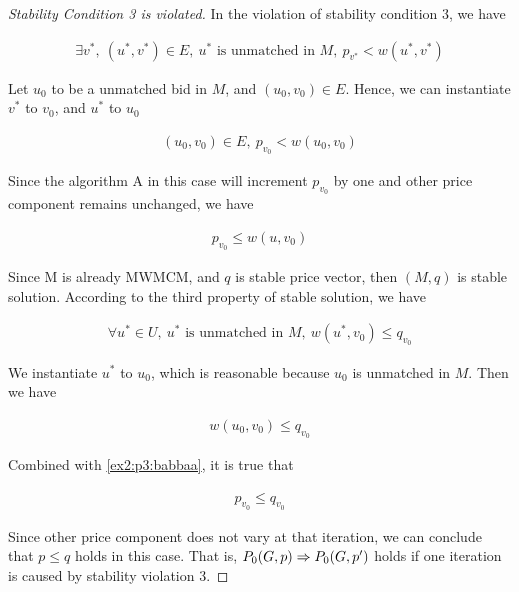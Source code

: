 \documentclass[11pt,a4paper]{article}
\begin{document}
\begin{proof}[Stability Condition 3 is violated]

    In the violation of stability condition 3, we have

    \begin{align}
        \exists v^{*},\ (u^{*}, v^{*}) \in E,\ u^{*} \text{ is unmatched in } M,\ p_{v^{*}} < w(u^{*}, v^{*})
    \end{align}

    Let $u_0$ to be a unmatched bid in $M$, and $(u_0, v_0) \in E$. 
    Hence, we can instantiate $v^{*}$ to $v_0$, and $u^{*}$ to $u_0$

    \begin{align}
        (u_0, v_0) \in E,\ p_{v_0} < w(u_0, v_0)
    \end{align}
    
    Since the algorithm A in this case will increment $p_{v_0}$ by one and other
    price component remains unchanged, we have

    \begin{align} \label{ex2:p3:babbaa}
        p_{v_0} \leq w(u, v_0)
    \end{align}

    Since M is already MWMCM, and $q$ is stable price vector, then $(M, q)$ is
    stable solution. According to the third property of stable solution, we
    have

    \begin{align}
        \forall u^{*} \in U,\ u^{*}\text{ is unmatched in } M,\ w(u^{*}, v_0) \leq q_{v_0}
    \end{align}

    We instantiate $u^{*}$ to $u_0$, which is reasonable because $u_0$ is
    unmatched in $M$. Then we have

    \begin{align}
        w(u_0, v_0) \leq q_{v_0}
    \end{align}

    Combined with \eqref{ex2:p3:babbaa}, it is true that

    \begin{align}
        p_{v_0} \leq q_{v_0}
    \end{align}

    Since other price component does not vary at that iteration, we can
    conclude that $p \leq q$ holds in this case. That is, $ P_0(G, p) \Rightarrow
    P_0(G, p') $ holds if one iteration is caused by stability violation 3.

\end{proof}
\end{document}

